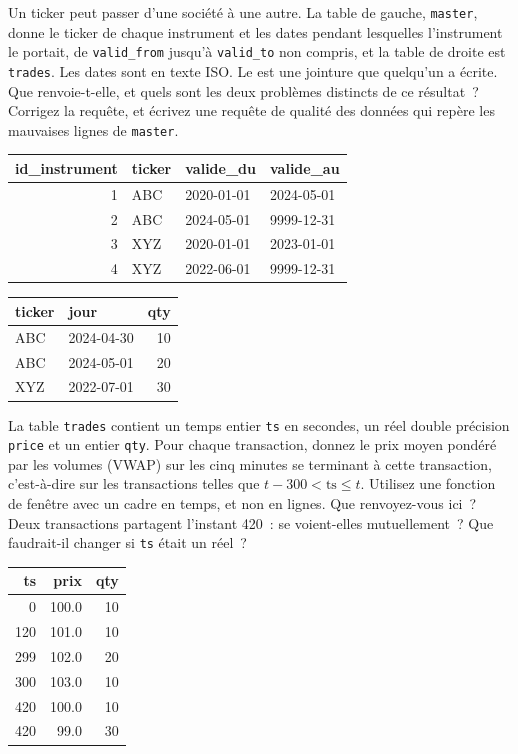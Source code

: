 \begin{question}\label{iq:iv3:sql-and-data:22}
Un ticker peut passer d'une société à une autre. La table de gauche, \texttt{master}, donne le ticker de chaque instrument et les dates pendant lesquelles l'instrument le portait, de \texttt{valid\_from} jusqu'à \texttt{valid\_to} non compris, et la table de droite est \texttt{trades}. Les dates sont en texte ISO. Le  est une jointure que quelqu'un a écrite. Que renvoie-t-elle, et quels sont les deux problèmes distincts de ce résultat~? Corrigez la requête, et écrivez une requête de qualité des données qui repère les mauvaises lignes de \texttt{master}.
\begin{center}\small
\begin{tabular}{rlll}
id\_instrument & ticker & valide\_du & valide\_au\\\hline
1 & ABC & 2020-01-01 & 2024-05-01\\
2 & ABC & 2024-05-01 & 9999-12-31\\
3 & XYZ & 2020-01-01 & 2023-01-01\\
4 & XYZ & 2022-06-01 & 9999-12-31
\end{tabular}\qquad
\begin{tabular}{llr}
ticker & jour & qty\\\hline
ABC & 2024-04-30 & 10\\
ABC & 2024-05-01 & 20\\
XYZ & 2022-07-01 & 30
\end{tabular}
\end{center}
\label{lst:iv3:sq:pit}
\end{question}

\begin{question}\label{iq:iv3:sql-and-data:23}
La table \texttt{trades} contient un temps entier \texttt{ts} en secondes, un réel double précision \texttt{price} et un entier \texttt{qty}. Pour chaque transaction, donnez le prix moyen pondéré par les volumes (VWAP) sur les cinq minutes se terminant à cette transaction, c'est-à-dire sur les transactions telles que $t - 300 < \text{ts} \le t$. Utilisez une fonction de fenêtre avec un cadre en temps, et non en lignes. Que renvoyez-vous ici~? Deux transactions partagent l'instant 420~: se voient-elles mutuellement~? Que faudrait-il changer si \texttt{ts} était un réel~?
\begin{center}\small
\begin{tabular}{rrr}
ts & prix & qty\\\hline
0 & 100.0 & 10\\
120 & 101.0 & 10\\
299 & 102.0 & 20\\
300 & 103.0 & 10\\
420 & 100.0 & 10\\
420 & 99.0 & 30
\end{tabular}
\end{center}
\end{question}

